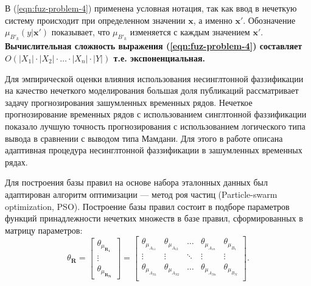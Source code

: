 В (\ref{eqn:fuz-problem-4}) применена условная нотация, так как ввод в нечеткую систему происходит при определенном значении $\mathbf{x}$, а именно $\mathbf{x'}$. Обозначение $\mu_{B'_k}(y | \mathbf{x'})$ показывает, что $\mu_{B'_k}$ изменяется с каждым значением $\mathbf{x'}$. \textbf{Вычислительная сложность выражения (\ref{eqn:fuz-problem-4}) составляет $O(|X_1|\cdot |X_2|\cdot \dots \cdot |X_n|\cdot |Y|)$ т.е. экспоненциальная.}

Для эмпирической оценки влияния использования несинглтонной фаззификации на качество нечеткого моделирования большая доля публикаций рассматривает задачу прогнозирования зашумленных временных рядов. Нечеткое прогнозирование временных рядов с использованием синглтонной фаззификации показало лучшую точность прогнозирования с использованием логического типа вывода в сравнении с выводом типа Мамдани. Для этого в работе описана адаптивная процедура несинглтонной фаззификации в зашумленных временных рядах.

Для построения базы правил на основе набора эталонных данных был адаптирован алгоритм оптимизации --- метод роя частиц (Particle-swarm optimization, PSO). Построение базы правил состоит в подборе параметров функций принадлежности нечетких множеств в базе правил, сформированных в матрицу параметров:
\begin{equation*}
	\theta_{\mathbf{R}} = \begin{bmatrix}
		\theta_{\mu_{\mathbf{R_1}}}\\
		\vdots\\
		\theta_{\mu_{\mathbf{R_N}}}
	\end{bmatrix} = \begin{bmatrix}
		\theta_{\mu_{A_{11}}} & \theta_{\mu_{A_{12}}} & \dots & \theta_{\mu_{A_{1n}}} & \theta_{\mu_{B_{1}}} \\
		\vdots & \vdots & \ddots & \vdots & \vdots \\
		\theta_{\mu_{A_{N1}}} & \theta_{\mu_{A_{N2}}} & \dots & \theta_{\mu_{A_{Nn}}} & \theta_{\mu_{B_{N}}} \\
	\end{bmatrix}.
\end{equation*}


